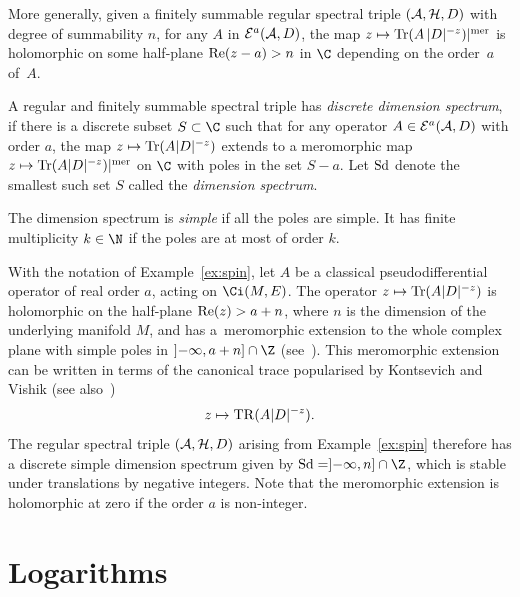 More generally, given a f\/initely summable regular spectral triple  $\left({\cal A}, {\cal H},
  D\right)$ with degree of summability $n$, for any $A $ in ${\cal E}^a({\cal A}, D)$, the map $z\mapsto {\rm Tr}(A \,\vert D\vert^{-z})\vert^{\rm
  mer}$ is holomorphic on some half-plane ${\rm Re}(z-a)>n$ in  $\C$
depending on the order~$a$ of~$A$.

\begin{definition}
A regular and f\/initely summable spectral triple  has   {\it  discrete dimension
spectrum}, if  there is a discrete subset $S\subset \C$ such that for any
operator $A\in {\cal E}^a({\cal A}, D)$ with order $a$, the  map
 $z\mapsto {\rm Tr}(A  \vert D\vert^{-z})$
extends to a meromorphic map  $z\mapsto
 {\rm Tr}(A  \vert D\vert^{-z})\vert^{\rm
  mer}$ on $\C$
with  poles   in the  set
$S-a$. Let ${\rm Sd}$ denote the smallest such set $S$ called the {\it dimension
spectrum}.

 The dimension spectrum is {\it simple} if all the poles are
simple. It has f\/inite multiplicity  $k\in \N$ if the poles are at most of order $k$.\end{definition}

\begin{example} With the notation of   Example~\ref{ex:spin}, let $A$ be a
  classical pseudodif\/ferential operator of real order $a$, acting on
  $\Ci(M, E)$. The operator $z\mapsto {\rm Tr}(A  \vert
   D\vert^{-z})$  is holomorphic on  the half-plane ${\rm Re}(z)>a+n$, where
   $n$ is the dimension of the underlying manifold $M$, and has a~meromorphic
   extension to the whole complex plane with simple poles  in $]{-}\infty,
   a+n]\cap \Z$ (see~\cite{Se}).   This meromorphic extension can be written
   in terms of the canonical trace popularised by Kontsevich and Vishik \cite{KV} (see also~\cite{L})
   \[
   z\mapsto {\rm TR}(A  \vert    D\vert^{-z}).
   \]   The regular spectral triple $\left({\cal A}, {\cal H}, D\right)$
 arising from  Example~\ref{ex:spin}
 therefore has a  discrete simple dimension spectrum given by
  ${\rm Sd}= ]{-}\infty, n]\cap \Z$, which  is stable
under translations by negative integers. Note that the meromorphic extension is
holomorphic at zero if the order $a$ is non-integer.
\end{example}


\section{Logarithms}\label{section3}

